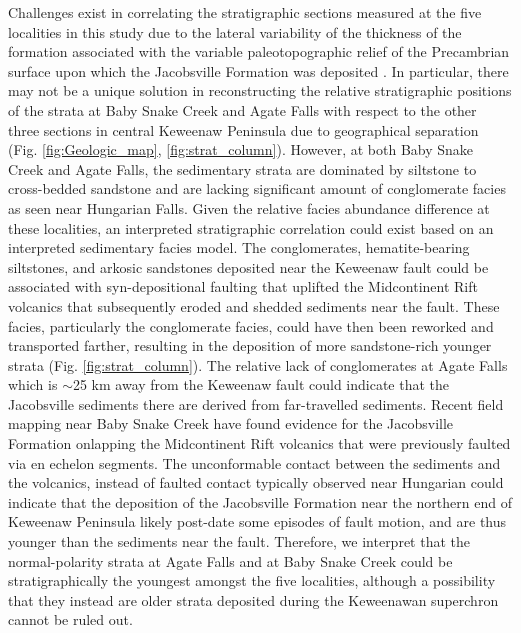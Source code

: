 \documentclass[draft]{agujournal2019}
\begin{document}
Challenges exist in correlating the stratigraphic sections measured at the five localities in this study due to the lateral variability of the thickness of the formation associated with the variable paleotopographic relief of the Precambrian surface upon which the Jacobsville Formation was deposited \cite{Hamblin1958a, Kalliokoski1982a}. In particular, there may not be a unique solution in reconstructing the relative stratigraphic positions of the strata at Baby Snake Creek and Agate Falls with respect to the other three sections in central Keweenaw Peninsula due to geographical separation (Fig. \ref{fig:Geologic_map}, \ref{fig:strat_column}). However, at both Baby Snake Creek and Agate Falls, the sedimentary strata are dominated by siltstone to cross-bedded sandstone and are lacking significant amount of conglomerate facies as seen near Hungarian Falls. Given the relative facies abundance difference at these localities, an interpreted stratigraphic correlation could exist based on an interpreted sedimentary facies model. The conglomerates, hematite-bearing siltstones, and arkosic sandstones deposited near the Keweenaw fault could be associated with syn-depositional faulting that uplifted the Midcontinent Rift volcanics that subsequently eroded and shedded sediments near the fault. These facies, particularly the conglomerate facies, could have then been reworked and transported farther, resulting in the deposition of more sandstone-rich younger strata (Fig. \ref{fig:strat_column}). The relative lack of conglomerates at Agate Falls which is $\sim$25 km away from the Keweenaw fault could indicate that the Jacobsville sediments there are derived from far-travelled sediments. Recent field mapping near Baby Snake Creek have found evidence for the Jacobsville Formation onlapping the Midcontinent Rift volcanics that were previously faulted via en echelon segments\cite{Tyrrell2019a, Mueller2021a}. The unconformable contact between the sediments and the volcanics, instead of faulted contact typically observed near Hungarian could indicate that the deposition of the Jacobsville Formation near the northern end of Keweenaw Peninsula likely post-date some episodes of fault motion, and are thus younger than the sediments near the fault. Therefore, we interpret that the normal-polarity strata at Agate Falls and at Baby Snake Creek could be stratigraphically the youngest amongst the five localities, although a possibility that they instead are older strata deposited during the Keweenawan superchron \cite{Driscoll2016b} cannot be ruled out. 
\end{document}
